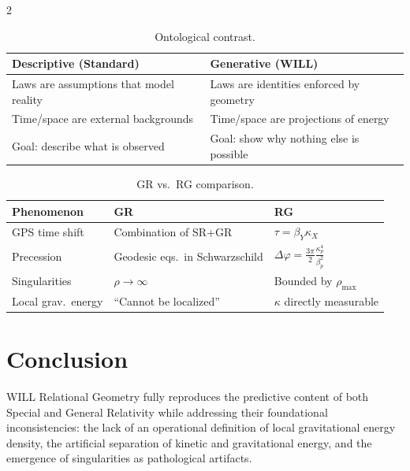 \documentclass[10pt, a4paper]{article}
\begin{document}
\begin{multicols}{2}
\begin{table}[H]
\centering\footnotesize
\renewcommand{\arraystretch}{1.2}
\begin{tabular}{|p{3.5cm}|p{3.5cm}|}
\hline
\textbf{Descriptive (Standard)} & \textbf{Generative (WILL)} \\
\hline
Laws are assumptions that model reality &
Laws are identities enforced by geometry \\
\hline
Time/space are external backgrounds &
Time/space are projections of energy \\
\hline
Goal: describe what is observed &
Goal: show why nothing else is possible \\
\hline
\end{tabular}
\caption{Ontological contrast.}
\end{table}

\hypertarget{GRvsRG}{}\label{GRvsRG}
\begin{table}[H]
\centering\footnotesize
\renewcommand{\arraystretch}{1.1}
\begin{tabular}{|p{2cm}|p{2.5cm}|p{2.5cm}|}
\hline
\textbf{Phenomenon} & \textbf{GR} & \textbf{RG} \\
\hline
GPS time shift & Combination of SR+GR & $\tau=\beta_Y\kappa_X$ \\
\hline
Precession & Geodesic eqs.\ in Schwarzschild & $\Delta\varphi=\frac{3\pi}{2}\frac{\kappa_p^4}{\beta_p^2}$ \\
\hline
Singularities & $\rho\to\infty$ & Bounded by $\rho_{\max}$ \\
\hline
Local grav.\ energy & ``Cannot be localized'' & $\kappa$ directly measurable \\
\hline
\end{tabular}
\caption{GR vs.\ RG comparison.}
\end{table}



\section{Conclusion}

WILL Relational Geometry fully reproduces the predictive content of both Special and General Relativity while addressing their foundational inconsistencies: the lack of an operational definition of local gravitational energy density, the artificial separation of kinetic and gravitational energy, and the emergence of singularities as pathological artifacts.


\end{multicols}
\end{document}
